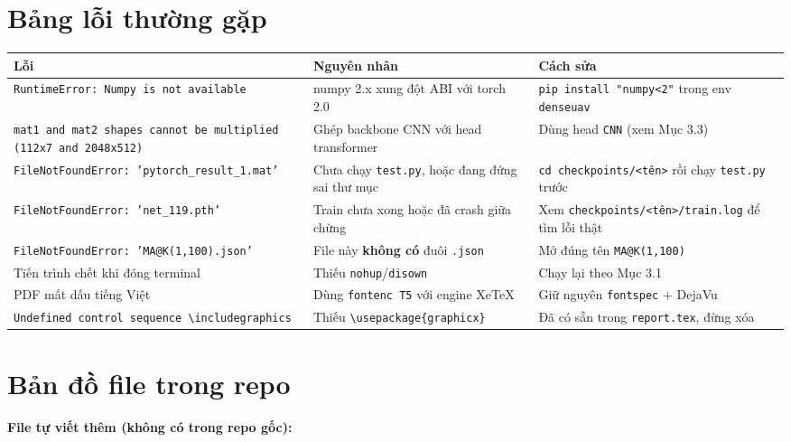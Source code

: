\documentclass[11pt]{article}
\newcommand{\cmd}[1]{\texttt{\footnotesize #1}}
\begin{document}
\section{Bảng lỗi thường gặp}

\begin{center}
\begin{tabularx}{\textwidth}{LLL}
\toprule
\textbf{Lỗi} & \textbf{Nguyên nhân} & \textbf{Cách sửa} \\
\midrule
\cmd{RuntimeError: Numpy is not available} & numpy 2.x xung đột ABI với torch 2.0 & \cmd{pip install "numpy<2"} trong env \texttt{denseuav} \\
\addlinespace
\cmd{mat1 and mat2 shapes cannot be multiplied (112x7 and 2048x512)} & Ghép backbone CNN với head transformer & Dùng head \cmd{*CNN} (xem Mục 3.3) \\
\addlinespace
\cmd{FileNotFoundError: 'pytorch\_result\_1.mat'} & Chưa chạy \texttt{test.py}, hoặc đang đứng sai thư mục & \cmd{cd checkpoints/<tên>} rồi chạy \texttt{test.py} trước \\
\addlinespace
\cmd{FileNotFoundError: 'net\_119.pth'} & Train chưa xong hoặc đã crash giữa chừng & Xem \cmd{checkpoints/<tên>/train.log} để tìm lỗi thật \\
\addlinespace
\cmd{FileNotFoundError: 'MA@K(1,100).json'} & File này \textbf{không có} đuôi \texttt{.json} & Mở đúng tên \cmd{MA@K(1,100)} \\
\addlinespace
Tiến trình chết khi đóng terminal & Thiếu \texttt{nohup}/\texttt{disown} & Chạy lại theo Mục 3.1 \\
\addlinespace
PDF mất dấu tiếng Việt & Dùng \texttt{fontenc T5} với engine XeTeX & Giữ nguyên \texttt{fontspec} + DejaVu \\
\addlinespace
\cmd{Undefined control sequence \textbackslash includegraphics} & Thiếu \texttt{\textbackslash usepackage\{graphicx\}} & Đã có sẵn trong \texttt{report.tex}, đừng xóa \\
\bottomrule
\end{tabularx}
\end{center}

\section{Bản đồ file trong repo}

\textbf{File tự viết thêm (không có trong repo gốc):}
\end{document}
